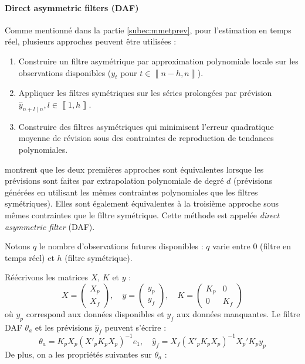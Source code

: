 \documentclass[
  11pt,
  french,
  a4paper]{article}
\newcommand\1{\mathds{1}}
\begin{document}
\hypertarget{direct-asymmetric-filters-daf}{%
\paragraph{Direct asymmetric filters (DAF)}\label{direct-asymmetric-filters-daf}}

Comme mentionné dans la partie \ref{subec:mmetprev}, pour l'estimation en temps réel, plusieurs approches peuvent être utilisées :

\begin{enumerate}
\def\labelenumi{\arabic{enumi}.}
\item
  Construire un filtre asymétrique par approximation polynomiale locale sur les observations disponibles (\(y_{t}\) pour \(t\in\left\llbracket n-h,n\right\rrbracket\)).
\item
  Appliquer les filtres symétriques sur les séries prolongées par prévision \(\hat{y}_{n+l\mid n},l\in\left\llbracket 1,h\right\rrbracket\).
\item
  Construire des filtres asymétriques qui minimisent l'erreur quadratique moyenne de révision sous des contraintes de reproduction de tendances polynomiales.
\end{enumerate}

\textcite{proietti2008} montrent que les deux premières approches sont équivalentes lorsque les prévisions sont faites par extrapolation polynomiale de degré \(d\) (prévisions générées en utilisant les mêmes contraintes polynomiales que les filtres symétriques).
Elles sont également équivalentes à la troisième approche sous mêmes contraintes que le filtre symétrique.
Cette méthode est appelée \emph{direct asymmetric filter} (DAF).

Notons \(q\) le nombre d'observations futures disponibles : \(q\) varie entre 0 (filtre en temps réel) et \(h\) (filtre symétrique).

Réécrivons les matrices \(X\), \(K\) et \(y\) :
\[
X=\begin{pmatrix}X_{p}\\
X_{f}
\end{pmatrix},\quad y=\begin{pmatrix}y_{p}\\
y_{f}
\end{pmatrix},\quad K=\begin{pmatrix}K_{p} & 0\\
0 & K_{f}
\end{pmatrix}
\]
où \(y_{p}\) correspond aux données disponibles et \(y_{f}\) aux données manquantes.
Le filtre DAF \(\theta_{a}\) et les prévisions \(\hat{y}_{f}\) peuvent s'écrire :
\[
\theta_{a}=K_{p}X_{p}(X'_{p}K_{p}X_{p})^{-1}e_{1},
\quad
\hat{y}_{f}=X_{f}(X'_{p}K_{p}X_{p})^{-1}X_{p}'K_{p}y_{p}
\]
De plus, on a les propriétés suivantes sur \(\theta_{a}\) :
\end{document}
